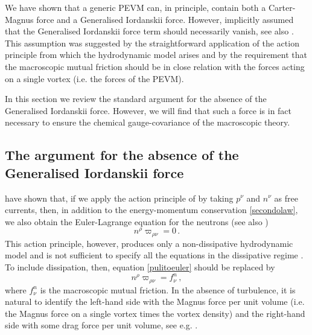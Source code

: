 \documentclass[preprints,article,accept,moreauthors,pdftex]{mdpi}
\begin{document}
We have shown that a generic PEVM can, in principle, contain both a Carter-Magnus force and a Generalised Iordanskii force. However, \citet{langlois98} implicitly assumed that the Generalised Iordanskii force term should necessarily vanish, see also \cite{Andersson_Mutual_Friction_2016}. 
This assumption was suggested by the straightforward application of the action principle from which the hydrodynamic model arises and by the requirement that the macroscopic mutual friction should be in close relation with the forces acting on a single vortex (i.e. the forces of the PEVM). 

In this section we review the standard argument for the absence of the Generalised Iordanskii force. 
However, we will find that such a force is in fact necessary to ensure the chemical gauge-covariance of the macroscopic theory.

\subsection{The argument for the absence of the Generalised Iordanskii force}
\label{eulero}

\citet{langlois98} have shown that, if we apply the action principle of \citet{Carter_Starting_Point} by taking $p^\nu$ and $n^\nu$ as free currents, then, in addition to the energy-momentum conservation  \eqref{secondolaw}, we also obtain the Euler-Lagrange equation for the neutrons (see also \cite{Termo})
\begin{equation}\label{pulitoeuler}
n^\rho \varpi_{\rho \nu} =0 \, .
\end{equation}
This action principle, however, produces only a non-dissipative hydrodynamic model and is not sufficient to specify all the equations in the dissipative regime \cite{Termo}. 
To include dissipation, then, equation \eqref{pulitoeuler} should be replaced by
\begin{equation}
\label{batuffolo}
n^\rho \varpi_{\rho \nu} = f^n_\nu \, ,
\end{equation} 
where $f^n_\nu$ is the macroscopic  mutual friction. 
In the absence of turbulence, it is natural to identify the left-hand side with the Magnus force per unit volume (i.e. the Magnus force on a single vortex times the vortex density) and the right-hand side with some drag force  per unit volume, see e.g. \cite{andersson_sidery_2006,sourie2020IJMPB,antonelli2020MNRAS,nemirovskii_closure_2020JLTP}. 

\end{document}
